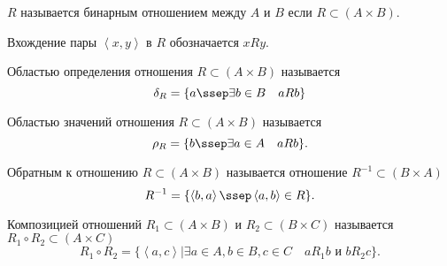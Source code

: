     \begin{definition} 
        $R$ называется бинарным отношением между $A$ и $B$ если $R \subset \left( A \times B \right) $.

        Вхождение пары $\left<x,y\right>$ в $R$ обозначается $xRy$.
    \end{definition}
    \begin{definition} 
        Областью определения отношения $R \subset \left( A \times B \right) $ называется 
        \[\delta_{R} = \{a \ssep \exists{b\in B}\quad aRb\}\]
    \end{definition}
    \begin{definition} 
        Областью значений отношения $R \subset \left( A \times B \right) $ называется
        \[ \rho_{R} = \{b \ssep \exists{a\in A}\quad aRb\}  .\] 
    \end{definition}
    \begin{definition}  
        Обратным к отношению $R \subset \left( A \times B \right) $ называется отношение $R^{-1} \subset \left( B \times A \right) $
        \[ R^{-1} = \{\left<b, a\right> \ssep \left<a, b\right>\in R\}  .\] 
    \end{definition}
    \begin{definition} 
        Композицией отношений $R_1 \subset \left( A \times B \right) $ и $R_2 \subset \left( B \times C \right) $ называется $R_1 \circ R_2 \subset \left( A \times C \right) $
        \[ R_1 \circ R_2 = \{\left<a, c\right> | \exists{a\in A, b\in B, c\in C}\quad aR_1b \text{ и } bR_2c \}  .\] 
    \end{definition}
